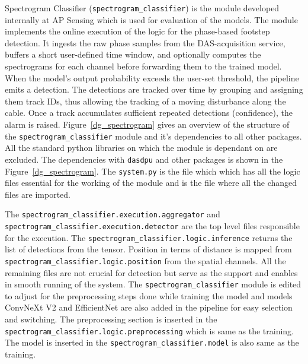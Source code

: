 Spectrogram Classifier (\texttt{spectrogram\_classifier}) is the module developed internally at AP Sensing which is used for evaluation of the models. The module implements the online execution of the logic for the phase-based footstep detection. It ingests the raw phase samples from the DAS-acquisition service, buffers a short user-defined time window, and optionally computes the spectrograms for each channel before forwarding them to the trained model. When the model's output probability exceeds the user-set threshold, the pipeline emits a detection. The detections are tracked over time by grouping and assigning them track IDs, thus allowing the tracking of a moving disturbance along the cable. Once a track accumulates sufficient repeated detections (confidence), the alarm is raised. Figure~\ref{dg_spectrogram} gives an overview of the structure of the \texttt{spectrogram\_classifier} module and it's dependencies to all other packages. All the standard python libraries on which the module is dependant on are excluded. The dependencies with \texttt{dasdpu} and other packages is shown in the Figure~\ref{dg_spectrogram}. The \texttt{system.py} is the file which which has all the logic files essential for the working of the module and is the file where all the changed files are imported. 

The \texttt{spectrogram\_classifier.execution.aggregator} and \texttt{spectrogram\_classifier.execution.detector} are the top level files responsible for the execution. The \texttt{spectrogram\_classifier.logic.inference} returns the list of detections from the tensor. Position in terms of distance is mapped from \texttt{spectrogram\_classifier.logic.position} from the spatial channels. All the remaining files are not crucial for detection but serve as the support and enables in smooth running of the system. The \texttt{spectrogram\_classifier} module is edited to adjust for the preprocessing steps done while training the model and models ConvNeXt V2 and EfficientNet are also added in the pipeline for easy selection and switching. The preprocessing section is inserted in the \texttt{spectrogram\_classifier.logic.preprocessing} which is same as the training. The model is inserted in the \texttt{spectrogram\_classifier.model} is also same as the training.


